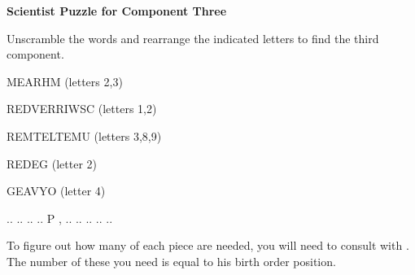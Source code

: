 \documentclass[white]{guildcamp3}
\begin{document}
\name{\wSciPuzzleThree{}} %

\large\textbf{Scientist Puzzle for Component Three}  

Unscramble the words and rearrange the indicated letters to find the third component.

MEARHM (letters 2,3)

REDVERRIWSC (letters 1,2)

REMTELTEMU (letters 3,8,9)

REDEG (letter 2)

GEAVYO (letter 4)

.. .. .. .. P  ,  .. .. .. .. ..


To figure out how many of each piece are needed, you will need to consult with \cSpecOpOne{\intro}. The number of these you need is equal to his birth order position. 
\end{document}
